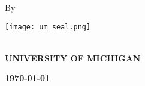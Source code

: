 \begin{titlepage}
\begin{center}
\vspace*{3cm}

\fontsize{20pt}{1cm}\selectfont \textbf{\thesistitle}



\vspace*{5.0cm}
By

\textbf{\thesisauthora}

\vfill
\texttt{[image: um\_seal.png]}

\vspace*{0.3in}
\fontsize{14pt}{14pt}\selectfont \textbf{\thesisdept}\\[0.2cm]
\vspace*{1cm}
\fontsize{20pt}{20pt}\selectfont \textbf{\MakeUppercase{University of Michigan}}

\vspace*{0.5cm}
\textbf{\today}
\vspace*{1cm}
\end{center}
\end{titlepage}